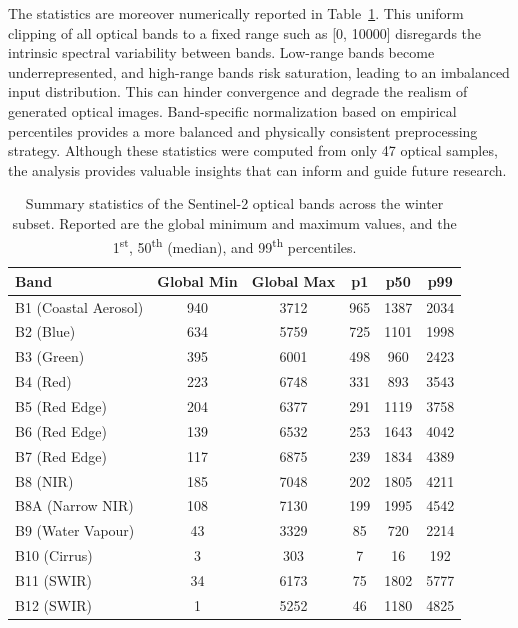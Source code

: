 The statistics are moreover numerically reported in Table~\ref{tab:s2_band_stats}. This uniform clipping of all optical bands to a fixed range such as [0, 10000] disregards the intrinsic spectral variability between bands. Low-range bands become underrepresented, and high-range bands risk saturation, leading to an imbalanced input distribution. This can hinder convergence and degrade the realism of generated optical images. Band-specific normalization based on empirical percentiles provides a more balanced and physically consistent preprocessing strategy. Although these statistics were computed from only 47 optical samples, the analysis provides valuable insights that can inform and guide future research.

\begin{table}[H]
\centering
\caption{Summary statistics of the Sentinel-2 optical bands across the winter subset. Reported are the global minimum and maximum values, and the 1\textsuperscript{st}, 50\textsuperscript{th} (median), and 99\textsuperscript{th} percentiles.}
\label{tab:s2_band_stats}
\begin{tabular}{lccccc}
\toprule
\textbf{Band} & \textbf{Global Min} & \textbf{Global Max} & \textbf{p1} & \textbf{p50} & \textbf{p99} \\
\midrule
B1  (Coastal Aerosol)  & 940  & 3712 & 965  & 1387 & 2034 \\
B2  (Blue)             & 634  & 5759 & 725  & 1101 & 1998 \\
B3  (Green)            & 395  & 6001 & 498  & 960  & 2423 \\
B4  (Red)              & 223  & 6748 & 331  & 893  & 3543 \\
B5  (Red Edge)       & 204  & 6377 & 291  & 1119 & 3758 \\
B6  (Red Edge)       & 139  & 6532 & 253  & 1643 & 4042 \\
B7  (Red Edge)       & 117  & 6875 & 239  & 1834 & 4389 \\
B8  (NIR)              & 185  & 7048 & 202  & 1805 & 4211 \\
B8A (Narrow NIR)       & 108  & 7130 & 199  & 1995 & 4542 \\
B9  (Water Vapour)     & 43   & 3329 & 85   & 720  & 2214 \\
B10 (Cirrus)           & 3    & 303  & 7    & 16   & 192  \\
B11 (SWIR)           & 34   & 6173 & 75   & 1802 & 5777 \\
B12 (SWIR)           & 1    & 5252 & 46   & 1180 & 4825 \\
\bottomrule
\end{tabular}
\end{table}

